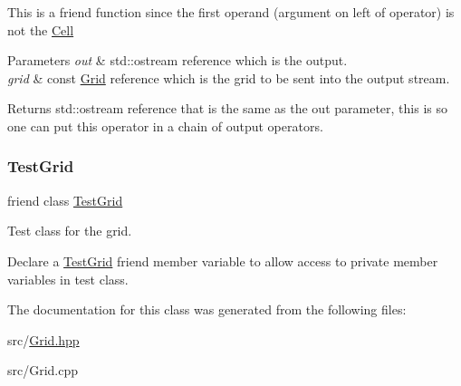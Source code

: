 This is a friend function since the first operand (argument on left of operator) is not the \hyperlink{class_cell}{Cell}


\begin{DoxyParams}{Parameters}
{\em out} & std\+::ostream reference which is the output.\\
\hline
{\em grid} & const \hyperlink{class_grid}{Grid} reference which is the grid to be sent into the output stream.\\
\hline
\end{DoxyParams}
\begin{DoxyReturn}{Returns}
std\+::ostream reference that is the same as the out parameter, this is so one can put this operator in a chain of output operators. 
\end{DoxyReturn}
\mbox{\label{class_grid_ac2cfb15a02d10acf2c124625070a2de8}} 
\subsubsection{\texorpdfstring{Test\+Grid}{TestGrid}}
{\footnotesize\ttfamily friend class \hyperlink{class_test_grid}{Test\+Grid}\hspace{0.3cm}{\ttfamily [friend]}}



Test class for the grid. 

Declare a \hyperlink{class_test_grid}{Test\+Grid} friend member variable to allow access to private member variables in test class. 

The documentation for this class was generated from the following files\+:\begin{DoxyCompactItemize}
\item 
src/\hyperlink{_grid_8hpp}{Grid.\+hpp}\item 
src/Grid.\+cpp\end{DoxyCompactItemize}
